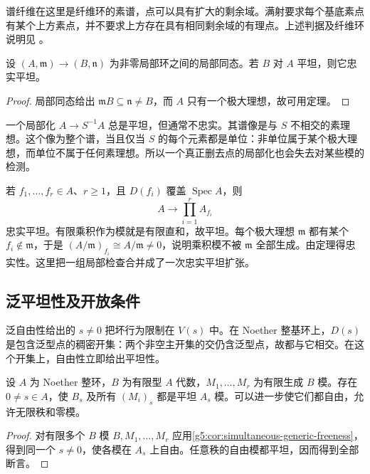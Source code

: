 谱纤维在这里是纤维环的素谱，点可以具有扩大的剩余域。满射要求每个基底素点有某个上方素点，并不要求上方存在具有相同剩余域的有理点。上述判据及纤维环说明见 \cite[第7节，定理7.2—7.3，第47—48页]{Matsumura1989}。

\begin{corollary}\label{g5:cor:flat-local-faithful}
	设 \((A,\mathfrak m)\to(B,\mathfrak n)\) 为非零局部环之间的局部同态。若 \(B\) 对 \(A\) 平坦，则它忠实平坦。
\end{corollary}
\begin{proof}
	局部同态给出 \(\mathfrak mB\subseteq\mathfrak n\ne B\)，而 \(A\) 只有一个极大理想，故可用定理。
\end{proof}

一个局部化 \(A\to S^{-1}A\) 总是平坦，但通常不忠实。其谱像是与 \(S\) 不相交的素理想。这个像为整个谱，当且仅当 \(S\) 的每个元素都是单位：非单位属于某个极大理想，而单位不属于任何素理想。所以一个真正删去点的局部化也会失去对某些模的检测。

\begin{example}\label{g5:exm:faithful-principal-cover}
	若 \(f_1,\ldots,f_r\in A\)、\(r\geq1\)，且 \(D(f_i)\) 覆盖 \(\operatorname{Spec}A\)，则
	\[
		A\longrightarrow\prod_{i=1}^r A_{f_i}
	\]
	忠实平坦。有限乘积作为模就是有限直和，故平坦。每个极大理想 \(\mathfrak m\) 都有某个 \(f_i\notin\mathfrak m\)，于是
	\((A/\mathfrak m)_{f_i}\cong A/\mathfrak m\ne0\)，说明乘积模不被 \(\mathfrak m\) 全部生成。由定理得忠实性。这里把一组局部检查合并成了一次忠实平坦扩张。
\end{example}

\subsection{泛平坦性及开放条件}
\label{g5:subsec:0604:03}

泛自由性给出的 \(s\ne0\) 把坏行为限制在 \(V(s)\) 中。在 Noether 整基环上，\(D(s)\) 是包含泛型点的稠密开集：两个非空主开集的交仍含泛型点，故都与它相交。在这个开集上，自由性立即给出平坦性。

\begin{corollary}[泛平坦性]\label{g5:cor:generic-flatness}
	设 \(A\) 为 Noether 整环，\(B\) 为有限型 \(A\) 代数，\(M_1,\ldots,M_r\) 为有限生成 \(B\) 模。存在 \(0\ne s\in A\)，使 \(B_s\) 及所有 \((M_i)_s\) 都是平坦 \(A_s\) 模。可以进一步使它们都自由，允许无限秩和零模。
\end{corollary}
\begin{proof}
	对有限多个 \(B\) 模 \(B,M_1,\ldots,M_r\) 应用\cref{g5:cor:simultaneous-generic-freeness}，得到同一个 \(s\ne0\)，使各模在 \(A_s\) 上自由。任意秩的自由模都平坦，因而得到全部断言。
\end{proof}

